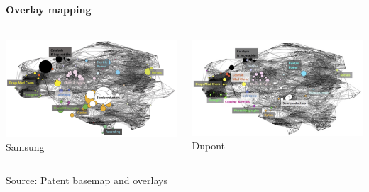 \documentclass[8pt]{beamer}
\begin{document}
\begin{frame}
\frametitle{\insertsection}
\framesubtitle{Overlay mapping}


\begin{columns}

\centering
\includegraphics[width=\linewidth,height=0.50\textheight,keepaspectratio]{patent_Samsung}\\
\tiny{Samsung}

\centering 
\includegraphics[width=\linewidth,height=0.50\textheight,keepaspectratio]{patent_Dupont}\\
\tiny{Dupont}

\end{columns}

\centering
\tiny{Source: Patent basemap and overlays \cite{Kay2014}}
	
\end{frame}
\end{document}
